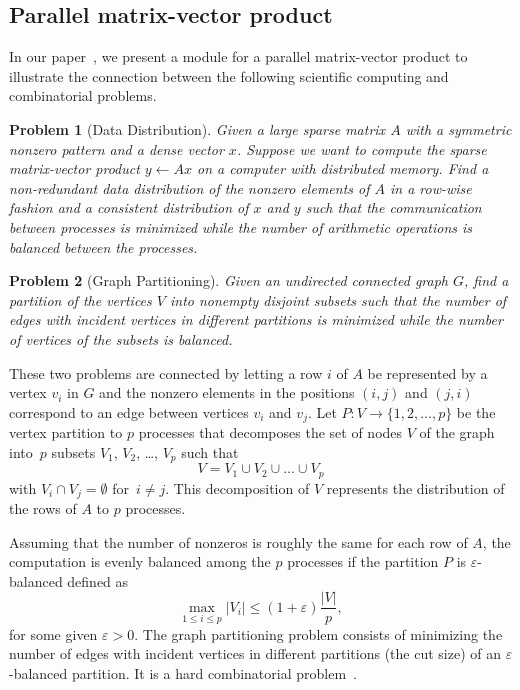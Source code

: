 \documentclass[12pt, twoside,a4paper,toc=bibliography]{scrbook}
\newtheorem{problem}{Problem}
\begin{document}
\subsection{Parallel matrix-vector product}
In our paper~\cite{2015:3}, we present a module for a parallel matrix-vector
product to illustrate the connection between the following scientific computing and combinatorial problems.
\begin{problem}[Data Distribution]
\label{p.par.mat.vec}
Given a large sparse matrix $A$ with a symmetric nonzero pattern and a dense
vector $x$. Suppose we want to compute the sparse matrix-vector product
$y \leftarrow Ax$ on a computer with distributed memory. Find a non-redundant
data distribution of the nonzero elements of $A$ in a row-wise fashion and a
consistent distribution of $x$ and $y$ such that the communication between
processes is minimized while the number of arithmetic operations is balanced
between the processes.
\end{problem}
\begin{problem}[Graph Partitioning]
\label{p.par.mat.vec.graph}
Given an undirected connected graph $G$, find a partition of the vertices $V$ into
nonempty disjoint subsets such that the number of edges with incident vertices
in different partitions is minimized while the number of vertices of the subsets
is balanced.
\end{problem}
These two problems are connected by letting a row $i$ of $A$ be represented by a vertex $v_i$
in $G$ and the nonzero elements in the positions $(i,j)$ and $(j,i)$ correspond to
an edge between vertices $v_i$ and $v_j$.
Let $P: V \rightarrow \{1, 2, \dots, p\}$ be the vertex partition to $p$ processes
that decomposes the set of nodes $V$ of the graph into~$p$ subsets $V_1$, $V_2$, \dots,
$V_p$ such that
$$
V = V_1 \cup V_2 \cup \dots \cup V_p
$$
with $V_i \cap V_j = \emptyset$ for~$i \neq j$. This decomposition of $V$ represents
the distribution of the rows of $A$ to $p$ processes.

Assuming that the number of nonzeros is roughly the same for each row of $A$, the
computation is evenly balanced among the $p$ processes if the partition $P$ is
$\varepsilon$-balanced defined as
\begin{equation}\label{e.bal}
\max_{1 \leq i \leq p} |V_i| \leq (1 + \varepsilon) \frac{|V|}{p} ,
\end{equation}
for some given $\varepsilon > 0$. The graph partitioning problem consists of minimizing
the number of edges with incident vertices in different partitions (the cut size)
of an $\varepsilon$-balanced partition. It is a hard combinatorial problem~\cite{gj:com}.
\end{document}
